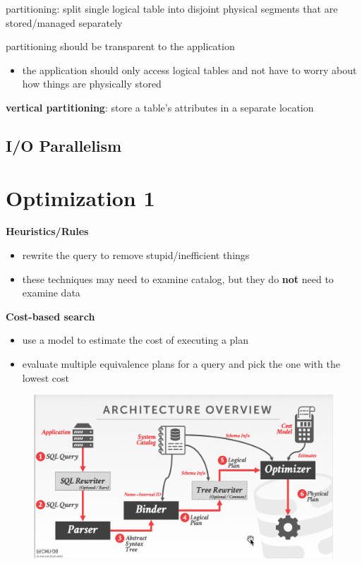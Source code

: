 \documentclass[11pt]{article}
\begin{document}
partitioning: split single logical table into disjoint physical segments that are stored/managed
separately

partitioning should be transparent to the application
\begin{itemize}
\item the application should only access logical tables and not have to worry about how things are
physically stored
\end{itemize}

\textbf{vertical partitioning}: store a table's attributes in a separate location


\subsection{I/O Parallelism}
\label{sec:org005c317}
\section{Optimization 1}
\label{sec:org7e12a23}
\textbf{Heuristics/Rules}
\begin{itemize}
\item rewrite the query to remove stupid/inefficient things
\item these techniques may need to examine catalog, but they do \textbf{not} need to examine data
\end{itemize}

\textbf{Cost-based search}
\begin{itemize}
\item use a model to estimate the cost of executing a plan
\item evaluate multiple equivalence plans for a query and pick the one with the lowest cost
\end{itemize}

\begin{figure}[htbp]
\centering
\includegraphics[width=.7\textwidth]{../images/15445/37.png}
\label{}
\end{figure}
\end{document}
